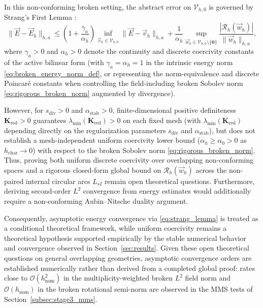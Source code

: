 \documentclass[VANCOUVER,Times1COL]{WileyNJD-v5}
\begin{document}
In this non-conforming broken setting, the abstract error on $\mathcal{V}_{h,0}$ is governed by Strang's First Lemma \cite{ciarlet2002finite, brenner2008mathematical}:
\begin{equation}
    \|\vec{E} - \vec{E}_h\|_{h, a} \le \left( 1 + \frac{\gamma_a}{\alpha_h} \right) \inf_{\vec{v}_h \in \mathcal{V}_{h,0}} \|\vec{E} - \vec{v}_h\|_{h, a} + \frac{1}{\alpha_h} \sup_{\vec{w}_h \in \mathcal{V}_{h,0} \setminus \{\mathbf{0}\}} \frac{|\mathcal{R}_h(\vec{w}_h)|}{\|\vec{w}_h\|_{h, a}},
    \label{eq:strang_lemma}
\end{equation}
where $\gamma_a > 0$ and $\alpha_h > 0$ denote the continuity and discrete coercivity constants of the active bilinear form (with $\gamma_a = \alpha_h = 1$ in the intrinsic energy norm \eqref{eq:broken_energy_norm_def}, or representing the norm-equivalence and discrete Poincaré constants when controlling the field-including broken Sobolev norm \eqref{eq:rigorous_broken_norm} augmented by divergence).

However, for $s_{\mathrm{div}} > 0$ and $\alpha_{\mathrm{stab}} > 0$, finite-dimensional positive definiteness $\mathbf{K}_{\mathrm{red}} > 0$ guarantees $\lambda_{\min}(\mathbf{K}_{\mathrm{red}}) > 0$ on each fixed mesh (with $\lambda_{\min}(\mathbf{K}_{\mathrm{red}})$ depending directly on the regularization parameters $s_{\mathrm{div}}$ and $\alpha_{\mathrm{stab}}$), but does not establish a mesh-independent uniform coercivity lower bound ($\alpha_h \ge \alpha_0 > 0$ as $h_{\mathrm{char}} \to 0$) with respect to the broken Sobolev norm \eqref{eq:rigorous_broken_norm}. Thus, proving both uniform discrete coercivity over overlapping non-conforming spaces and a rigorous closed-form global bound on $\mathcal{R}_h(\vec{w}_h)$ across the non-paired internal circular arcs $L_{sI}$ remain open theoretical questions. Furthermore, deriving second-order $L^2$ convergence from energy estimates would additionally require a non-conforming Aubin--Nitsche duality argument.

Consequently, asymptotic energy convergence via \eqref{eq:strang_lemma} is treated as a conditional theoretical framework, while uniform coercivity remains a theoretical hypothesis supported empirically by the stable numerical behavior and convergence observed in Section~\ref{sec:results}. Given these open theoretical questions on general overlapping geometries, asymptotic convergence orders are established numerically rather than derived from a completed global proof: rates close to $\mathcal{O}(h_{\mathrm{nom}}^2)$ in the multiplicity-weighted broken $L^2$ field norm and $\mathcal{O}(h_{\mathrm{nom}})$ in the broken rotational semi-norm are observed in the MMS tests of Section~\ref{subsec:stage3_mms}.
\end{document}
